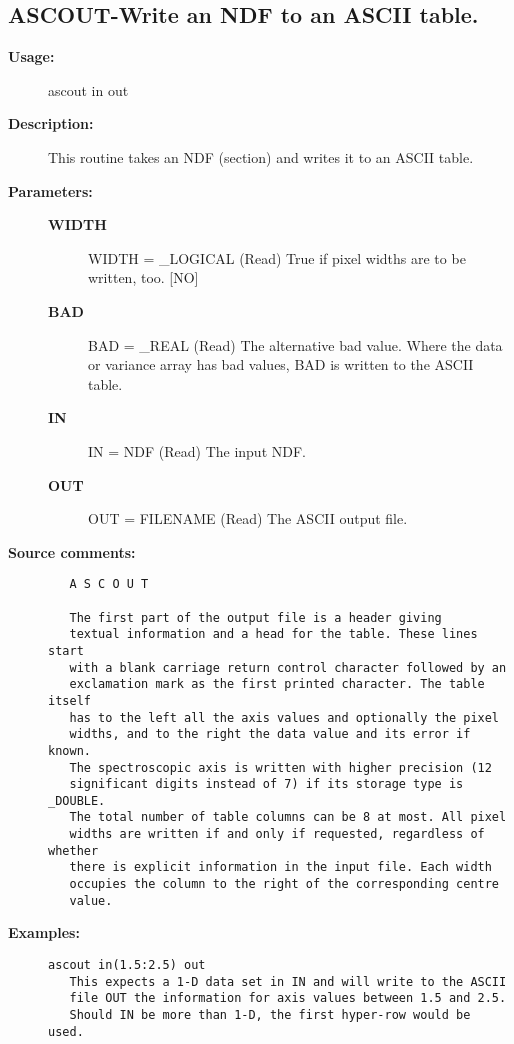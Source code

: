 \subsection{ASCOUT-\label{ASCOUT}Write an NDF to an ASCII table.}
\begin{description}

\item [{\bf Usage:}]

   ascout in out


\item [{\bf Description:}]
   This routine takes an NDF (section) and writes it to an ASCII
   table.


\item [{\bf Parameters:}]
\begin{description}
\item [{\bf WIDTH}]
WIDTH = _LOGICAL (Read)
   True if pixel widths are to be written, too. [NO]
\item [{\bf BAD}]
BAD = _REAL (Read)
   The alternative bad value. Where the data or variance array has
   bad values, BAD is written to the ASCII table.
\item [{\bf IN}]
IN = NDF (Read)
   The input NDF.
\item [{\bf OUT}]
OUT = FILENAME (Read)
   The ASCII output file.

\end{description}

\item [{\bf Source comments:}]
\begin{verbatim}
   A S C O U T

   The first part of the output file is a header giving
   textual information and a head for the table. These lines start
   with a blank carriage return control character followed by an
   exclamation mark as the first printed character. The table itself
   has to the left all the axis values and optionally the pixel
   widths, and to the right the data value and its error if known.
   The spectroscopic axis is written with higher precision (12
   significant digits instead of 7) if its storage type is _DOUBLE.
   The total number of table columns can be 8 at most. All pixel
   widths are written if and only if requested, regardless of whether
   there is explicit information in the input file. Each width
   occupies the column to the right of the corresponding centre
   value.

\end{verbatim}

\item [{\bf Examples:}]
\begin{verbatim}
ascout in(1.5:2.5) out
   This expects a 1-D data set in IN and will write to the ASCII
   file OUT the information for axis values between 1.5 and 2.5.
   Should IN be more than 1-D, the first hyper-row would be used.


\end{verbatim}
\end{description}
